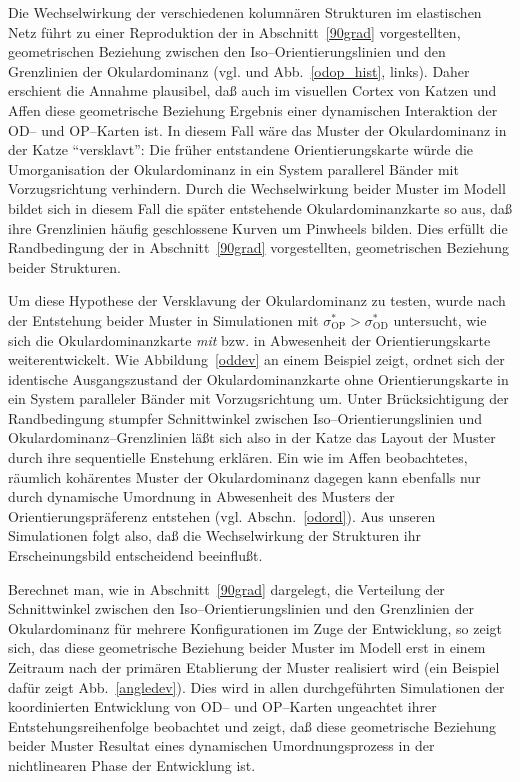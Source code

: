 Die Wechselwirkung der verschiedenen kolumnären Strukturen im elastischen
Netz führt zu einer Reproduktion der in Abschnitt~\ref{90grad}
vorgestellten, geometrischen Beziehung zwischen den
Iso--Orientierungslinien und den Grenzlinien der Okulardominanz
(vgl.  und Abb.~\ref{odop_hist}, links). Daher
erschient die Annahme plausibel, daß auch im visuellen Cortex von Katzen
und Affen diese geometrische Beziehung Ergebnis einer dynamischen
Interaktion der OD-- und OP--Karten ist. In diesem Fall wäre das Muster
der Okulardominanz in der Katze ``versklavt'': Die früher entstandene
Orientierungskarte würde die Umorganisation der Okulardominanz in ein
System parallerel Bänder mit Vorzugsrichtung verhindern.  Durch die
Wechselwirkung beider Muster im Modell bildet sich in diesem Fall die
später entstehende Okulardominanzkarte so aus, daß ihre Grenzlinien
häufig geschlossene Kurven um Pinwheels bilden. Dies erfüllt die
Randbedingung der in Abschnitt~\ref{90grad} vorgestellten, geometrischen
Beziehung beider Strukturen.

Um diese Hypothese der Versklavung der Okulardominanz zu testen, wurde nach
der Entstehung beider Muster in Simulationen mit
$\sigma^\ast_{\text{OP}}>\sigma^\ast_{\text{OD}}$ untersucht, wie sich die
Okulardominanzkarte \emph{mit} bzw. in Abwesenheit der Orientierungskarte
weiterentwickelt. Wie Abbildung~\ref{oddev} an einem Beispiel zeigt, ordnet
sich der identische Ausgangszustand der Okulardominanzkarte ohne
Orientierungskarte in ein System paralleler Bänder mit Vorzugsrichtung um.
Unter Brücksichtigung der Randbedingung stumpfer Schnittwinkel zwischen
Iso--Orientierungslinien und Okulardominanz--Grenzlinien läßt sich also
in der Katze das Layout der Muster durch ihre sequentielle Enstehung
erklären.  Ein wie im Affen beobachtetes, räumlich kohärentes Muster der
Okulardominanz dagegen kann ebenfalls nur durch dynamische Umordnung in
Abwesenheit des Musters der Orientierungspräferenz entstehen
(vgl. Abschn.~\ref{odord}).  Aus unseren Simulationen folgt also, daß die
Wechselwirkung der Strukturen ihr Erscheinungsbild entscheidend
beeinflußt.

Berechnet man, wie in Abschnitt~\ref{90grad} dargelegt, die Verteilung der
Schnittwinkel zwischen den Iso--Orientierungslinien und den Grenzlinien der
Okulardominanz für mehrere Konfigurationen im Zuge der Entwicklung, so
zeigt sich, das diese geometrische Beziehung beider Muster im Modell erst
in einem Zeitraum nach der primären Etablierung der Muster realisiert
wird (ein Beispiel dafür zeigt Abb.~\ref{angledev}).  Dies wird in allen
durchgeführten Simulationen der koordinierten Entwicklung von OD-- und
OP--Karten ungeachtet ihrer Entstehungsreihenfolge beobachtet und zeigt,
daß diese geometrische Beziehung beider Muster Resultat eines dynamischen
Umordnungsprozess in der nichtlinearen Phase der Entwicklung ist.
